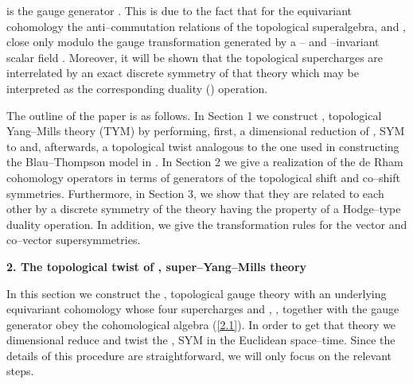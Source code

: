 \documentclass[a4paper,11pt]{article}
\begin{document}
is the gauge generator \coordHE{}. This is due to the fact that for the 
\coordHE{} equivariant cohomology the anti--commutation relations of the 
topological superalgebra, \coordHE{} and 
\coordHE{}, close only modulo the gauge transformation 
\coordHE{} generated by a \coordHE{}-- and \coordHE{}--invariant 
scalar field \myHighlight{$\phi$}\coordHE{}. 
Moreover, it will be shown that the topological supercharges are 
interrelated by an exact discrete symmetry of that theory which may be
interpreted as the corresponding duality (\myHighlight{$\star$}\coordHE{}) operation. 

The outline of the paper is as follows. In Section 1 we construct
\coordHE{}, \coordHE{} topological Yang--Mills theory (TYM) by performing, first, 
a dimensional reduction of \coordHE{}, \coordHE{} SYM to \coordHE{} and, afterwards,
a topological twist analogous to the one used in constructing the  
\coordHE{} Blau--Thompson model in \coordHE{} \cite{16}.
In Section 2 we give a realization of the de Rham cohomology operators in 
terms of generators of the topological shift and co--shift symmetries. 
Furthermore, in Section 3, we show that they are related to each other by a 
discrete 
symmetry of the theory having the property of a Hodge--type duality operation. 
In addition, we give the transformation rules for the vector and co--vector 
supersymmetries.
\bigskip
\begin{flushleft}
{\large{\bf 2. The topological twist of \coordHE{}, \coordHE{} 
super--Yang--Mills theory}}
\end{flushleft}
\bigskip
In this section we construct the \coordHE{}, \coordHE{} topological gauge theory 
with an underlying equivariant cohomology whose four supercharges
\coordHE{} and \coordHE{}, \coordHE{}, together with the gauge generator \coordHE{} 
obey the cohomological algebra (\ref{2.1}). In order to get that theory
we dimensional reduce and twist the \coordHE{}, \coordHE{} SYM 
in the Euclidean space--time. Since the details of this procedure are 
straightforward, we will only focus on the relevant steps.
\end{document}
